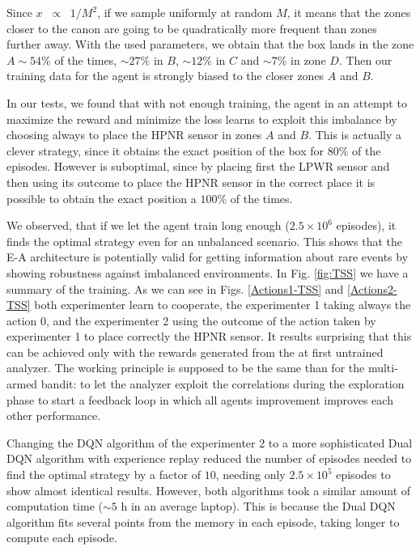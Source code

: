 \documentclass[11pt,a4paper,twoside]{report}
\newcommand{\+}{\textnormal{+} }
\theoremstyle{definition}
\numberwithin{equation}{chapter}
\begin{document}
Since $x\;\;\propto \;\;1/M^2$, if we sample uniformly at random $M$, it means
that the zones closer to the canon are going to be quadratically more frequent
than zones further away. With the used parameters, we obtain that the box lands
in the zone $A\sim54\%$ of the times, $\sim27\%$ in $B$, $\sim 12\%$ in
$C$ and $\sim7\%$ in zone $D$. Then our training data for the agent is 
strongly biased to the closer zones $A$ and $B$.

In our tests, we found that with not enough training, the agent in an attempt 
to maximize the reward and minimize the loss learns to exploit this imbalance by
choosing always to place the HPNR sensor in zones $A$ and $B$. This is actually
a clever strategy, since it obtains the exact position of the box for $80\%$ of
the episodes. However is suboptimal, since by placing first the LPWR sensor and
then using its outcome to place the HPNR sensor in the correct place it is
possible to obtain the exact position a $100\%$ of the times.

We observed, that if we let the agent train long enough ($2.5\times 10^6$
episodes), it finds the optimal strategy even for an unbalanced scenario. This
shows that the E-A architecture is potentially valid for getting information
about rare events by showing robustness against imbalanced environments. In Fig.
\ref{fig:TSS} we have a summary of the training. As we can see in Figs.
\ref{Actions1-TSS} and \ref{Actions2-TSS} both experimenter learn to cooperate,
the experimenter 1 taking always the action 0, and the experimenter 2 using the
outcome of the action taken by experimenter 1 to place correctly the HPNR
sensor. It results surprising that this can be achieved only with the rewards
generated from the at first untrained analyzer. The working principle is
supposed to be the same than for the multi-armed bandit: to let the analyzer
exploit the correlations during the exploration phase to start a feedback loop
in which all agents improvement improves each other performance.

Changing the DQN algorithm of the experimenter 2 to a more sophisticated Dual
DQN algorithm with experience replay reduced the number of episodes needed to
find the optimal strategy by a factor of $10$, needing only $2.5\times10^5$
episodes to show almost identical results. However, both algorithms took a
similar amount of computation time ($\sim 5$ h in an average laptop). This is
because the Dual DQN algorithm fits several points from the memory in each
episode, taking longer to compute each episode.
\end{document}
